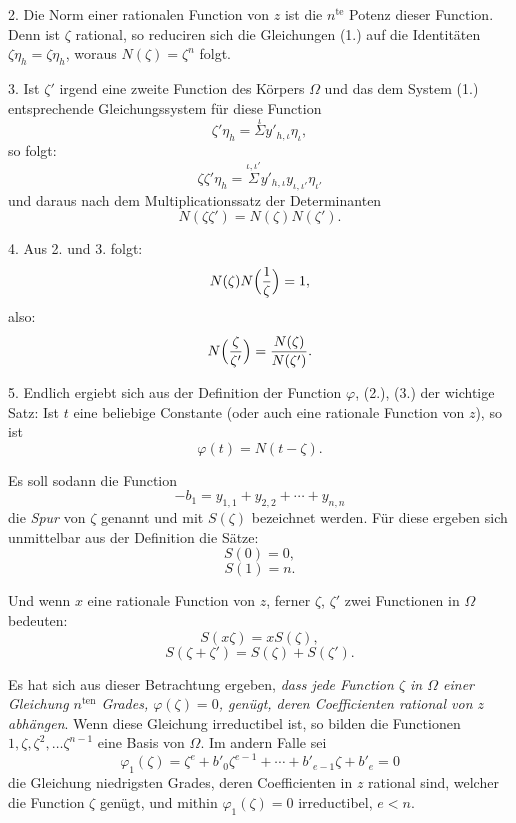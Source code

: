\documentclass{article}
\begin{document}
2. Die Norm einer rationalen Function von $z$ ist die $n^{\text{te}}$ Potenz dieser Function. Denn ist $\zeta$ rational, so reduciren sich die Gleichungen (1.) auf die Identitäten $\zeta\eta_{h} = \zeta\eta_{h}$, woraus $N(\zeta) = \zeta^{n}$ folgt.


3. Ist $\zeta'$ irgend eine zweite Function des Körpers $\Omega$ und das dem System (1.) entsprechende Gleichungssystem für diese Function
\[ \zeta'\eta_{h} = \overset{\iota}{\Sigma} y'_{h,\iota}\eta_{\iota}, \]
so folgt:
\[ \zeta\zeta'\eta_{h} = \overset{\iota,\iota'}{\Sigma} y'_{h,\iota}y_{\iota,\iota'}\eta_{\iota'} \]
und daraus nach dem Multiplicationssatz der Determinanten
\[ N(\zeta\zeta') = N(\zeta)N(\zeta'). \]

4. Aus 2. und 3. folgt:
\[ N(\zeta)N\Bigl(\frac{1}{\zeta}\Bigr) = 1, \]
also:
\[ N\Bigl(\frac{\zeta}{\zeta'}\Bigr) = \frac{N(\zeta)}{N(\zeta')}. \]

5. Endlich ergiebt sich aus der Definition der Function $\varphi$, (2.), (3.) der wichtige Satz: Ist $t$ eine beliebige Constante (oder auch eine rationale Function von $z$), so ist
\[ \varphi(t) = N(t-\zeta). \]

Es soll sodann die Function
\[ -b_{1} = y_{1,1} + y_{2,2} + \cdots + y_{n,n} \tag{5.} \]
die \emph{Spur} von $\zeta$ genannt und mit $S(\zeta)$ bezeichnet werden. Für diese ergeben sich unmittelbar aus der Definition die Sätze:
\[ S(0) = 0, \tag{6.} \]
\[ S(1) = n. \tag{7.} \]

Und wenn $x$ eine rationale Function von $z$, ferner $\zeta$, $\zeta'$ zwei Functionen in $\Omega$ bedeuten:
\[ S(x\zeta) = xS(\zeta), \tag{8.} \]
\[ S(\zeta+\zeta') = S(\zeta) + S(\zeta'). \tag{9.} \]

Es hat sich aus dieser Betrachtung ergeben, \emph{dass jede Function $\zeta$ in $\Omega$ einer Gleichung $n^{\text{ten}}$ Grades, $\varphi(\zeta) = 0$, genügt, deren Coefficienten rational von $z$ abhängen}. Wenn diese Gleichung irreductibel ist, so bilden die Functionen $1, \zeta, \zeta^{2}, \ldots \zeta^{n-1}$ eine Basis von $\Omega$. Im andern Falle sei
\[ \varphi_{1}(\zeta) = \zeta^{e} + b'_{0}\zeta^{e-1} + \cdots + b'_{e-1}\zeta + b'_{e} = 0 \tag{10.} \]
die Gleichung niedrigsten Grades, deren Coefficienten in $z$ rational sind, welcher die Function $\zeta$ genügt, und mithin $\varphi_{1}(\zeta) = 0$ irreductibel, $e < n$.
\end{document}
